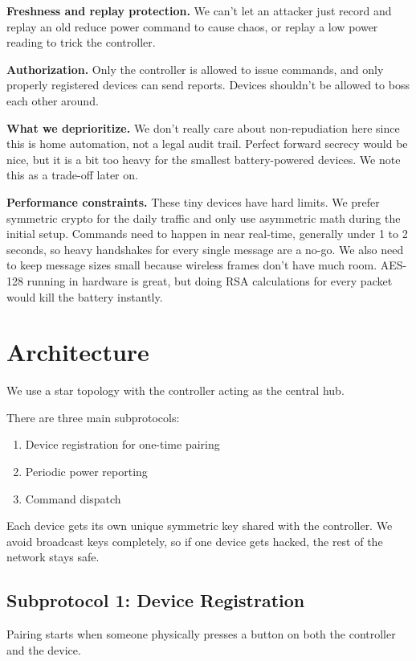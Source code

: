 \documentclass[a4paper,11pt]{article}
\begin{document}
\textbf{Freshness and replay protection.} We can't let an attacker just record and replay an old reduce power command to cause chaos, or replay a low power reading to trick the controller.

\textbf{Authorization.} Only the controller is allowed to issue commands, and only properly registered devices can send reports. Devices shouldn't be allowed to boss each other around.

\textbf{What we deprioritize.} We don't really care about non-repudiation here since this is home automation, not a legal audit trail. Perfect forward secrecy would be nice, but it is a bit too heavy for the smallest battery-powered devices. We note this as a trade-off later on.

\textbf{Performance constraints.} These tiny devices have hard limits. We prefer symmetric crypto for the daily traffic and only use asymmetric math during the initial setup. Commands need to happen in near real-time, generally under 1 to 2 seconds, so heavy handshakes for every single message are a no-go. We also need to keep message sizes small because wireless frames don't have much room. AES-128 running in hardware is great, but doing RSA calculations for every packet would kill the battery instantly.

\section{Architecture}

We use a star topology with the controller acting as the central hub.

There are three main subprotocols:
\begin{enumerate}
    \item Device registration for one-time pairing
    \item Periodic power reporting
    \item Command dispatch
\end{enumerate}

Each device gets its own unique symmetric key shared with the controller. We avoid broadcast keys completely, so if one device gets hacked, the rest of the network stays safe.

\subsection*{Subprotocol 1: Device Registration}

Pairing starts when someone physically presses a button on both the controller and the device.
\end{document}
